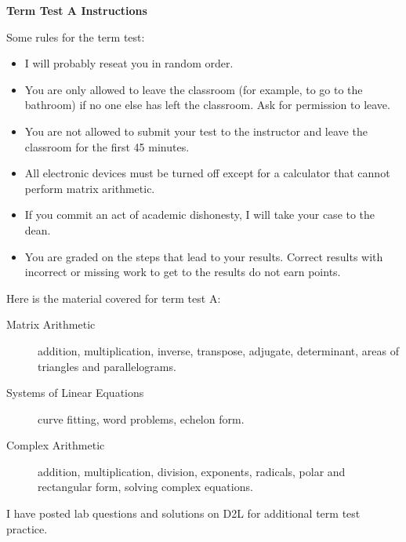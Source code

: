 \documentclass[11pt]{article}
\begin{document}
\textbf{Term Test A Instructions}

Some rules for the term test:
\begin{itemize}
\item I will probably reseat you in random order.
\item You are only allowed to leave the classroom (for example, to go
  to the bathroom) if no one else has left the classroom. Ask for
  permission to leave. 
\item You are not allowed to submit your test to the instructor and
  leave the classroom for the first 45 minutes.
\item All electronic devices must be turned off except for a
  calculator that cannot perform matrix arithmetic.
\item If you commit an act of academic dishonesty, I will take your
  case to the dean.
\item You are graded on the steps that lead to your results. Correct
  results with incorrect or missing work to get to the results do not
  earn points.
\end{itemize}

Here is the material covered for term test A:
\begin{description}
\item[Matrix Arithmetic] addition, multiplication, inverse, transpose,
  adjugate, determinant, areas of triangles and parallelograms.
\item[Systems of Linear Equations] curve fitting, word problems,
  echelon form.
\item[Complex Arithmetic] addition, multiplication, division,
  exponents, radicals, polar and rectangular form, solving complex
  equations.
\end{description}

I have posted lab questions and solutions on D2L for additional term
test practice.
\end{document}

